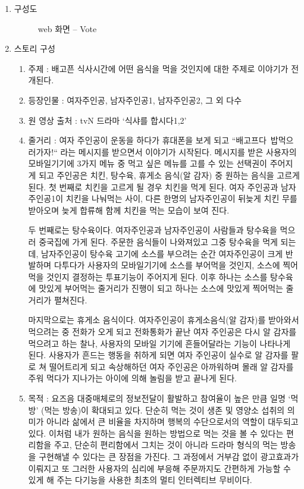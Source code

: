 \documentclass{oblivoir}
\begin{document}
\begin{enumerate}

\item 구성도

\begin{figure}[h!]
\centering
\caption{web 화면 – Vote}
\end{figure} 

\item 스토리 구성

    \begin{enumerate}%

        \item 주제 : 배고픈 식사시간에 어떤 음식을 먹을 것인지에 대한 주제로 이야기가 전개된다.  
        \item 등장인물 : 여자주인공, 남자주인공1, 남자주인공2, 그 외 다수
        \item 원 영상 출처 : tvN 드라마 ‘식샤를 합시다1,2’ 

        \item 줄거리 : 여자 주인공이 운동을 하다가 휴대폰을 보게 되고 “배고프다~밥먹으러가자!“ 라는 메시지를 받으면서 이야기가 시작된다. 메시지를 받은 사용자의 모바일기기에 3가지 메뉴 중 먹고 싶은 메뉴를 고를 수 있는 선택권이 주어지게 되고 주인공은 치킨, 탕수육, 휴게소 음식(알 감자) 중 원하는 음식을 고르게 된다. 첫 번째로 치킨을 고르게 될 경우 치킨을 먹게 된다. 여자 주인공과 남자주인공1이 치킨을 나눠먹는 사이, 다른 한명의 남자주인공이 뒤늦게 치킨 무를 받아오며 늦게 합류해 함께 치킨을 먹는 모습이 보여 진다. 

    두 번째로는 탕수육이다. 여자주인공과 남자주인공이 사람들과 탕수육을 먹으러 중국집에 가게 된다. 주문한 음식들이 나와져있고 그중 탕수육을 먹게 되는데, 남자주인공이 탕수육 고기에 소스를 부으려는 순간 여자주인공이 크게 반발하며 다투다가 사용자의 모바일기기에 소스를 부어먹을 것인지, 소스에 찍어먹을 것인지 결정하는 투표기능이 주어지게 된다. 이후 하나는 소스를 탕수육에 맛있게 부어먹는 줄거리가 진행이 되고 하나는 소스에 맛있게 찍어먹는 줄거리가 펼쳐진다. 

    마지막으로는 휴게소 음식이다. 여자주인공이 휴게소음식(알 감자)를 받아와서 먹으려는 중 전화가 오게 되고 전화통화가 끝난 여자 주인공은 다시 알 감자를 먹으려고 하는 찰나, 사용자의 모바일 기기에 흔들어달라는 기능이 나타나게 된다. 사용자가 흔드는 행동을 취하게 되면 여자 주인공이 실수로 알 감자를 팔로 쳐 떨어트리게 되고 속상해하던 여자 주인공은 아까워하며 몰래 알 감자를 주워 먹다가 지나가는 아이에 의해 놀림을 받고 끝나게 된다.

        \item 목적 : 요즈음 대중매체로의 정보전달이 활발하고 참여율이 높은 만큼 일명 ‘먹방’ (먹는 방송)이 확대되고 있다. 단순히 먹는 것이 생존 및 영양소 섭취의 의미가 아니라 삶에서 큰 비율을 차지하며 행복의 수단으로서의 역할이 대두되고 있다. 이처럼 내가 원하는 음식을 원하는 방법으로 먹는 것을 볼 수 있다는 편리함을 주고, 단순히 편리함에서 그치는 것이 아니라 드라마 형식의 먹는 방송을 구현해낼 수 있다는 큰 장점을 가진다. 그 과정에서 거부감 없이 광고효과가 이뤄지고 또 그러한 사용자의 심리에 부응해 주문까지도 간편하게 가능할 수 있게 해 주는 다기능을 사용한 최초의 멀티 인터렉티브 무비이다.  
    \end{enumerate}


\end{enumerate}
\end{document}
